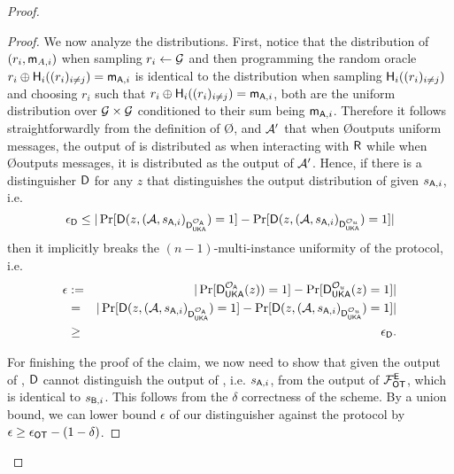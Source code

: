 \begin{proof}
\begin{proof}
We now analyze the distributions. 
First, notice that the distribution of $(r_i,\mathsf{m}_{A,i})$ when sampling $r_i\leftarrow\mathcal{G}$ and then programming the random oracle $r_i\oplus\mathsf{H}_i((r_i)_{i\neq j})=\mathsf{m}_{\mathsf{A},i}$ is identical to the distribution when sampling $\mathsf{H}_i((r_i)_{i\neq j})$ and choosing $r_i$  such that $r_i\oplus\mathsf{H}_i((r_i)_{i\neq j})=\mathsf{m}_{\mathsf{A},i}$, both are the uniform distribution over $\mathcal{G}\times\mathcal{G}$ conditioned to their sum being $\mathsf{m}_{\mathsf{A},i}$. Therefore it follows straightforwardly from the definition of \O, \rec and $\mathcal{A}'$ that when \O outputs uniform messages, the output of \Adv is distributed as when interacting with $\mathsf{R}$ while when \O outputs \UKA messages, it is distributed as the output of $\mathcal{A}'$. Hence, if there is a distinguisher $\mathsf D$ for any $z$ that distinguishes the output distribution of \Adv given $s_{\mathsf{A},i}$, i.e.
$$
\epsilon_{\mathsf D}\leq |\Pr[\mathsf D(z,(\mathcal{A},s_{\mathsf{A},i})_{\mathsf D_{\mathsf{UKA}}^{\mathcal{O}_\mathsf{A}}})=1]-\Pr[\mathsf D(z,(\mathcal{A},s_{\mathsf{A},i})_{\mathsf D_{\mathsf{UKA}}^{\mathcal{O}_u}})=1]|
$$
then it implicitly breaks the $(n-1)$-multi-instance uniformity of the \UKA protocol, i.e. 
\begin{eqnarray*}
\epsilon&:=& |\Pr[\mathsf D_{\mathsf{UKA}}^{\mathcal{O}_{\mathsf{A}}}(z))=1] -\Pr[ \mathsf D_{\mathsf{UKA}}^{\mathcal{O}_u}(z)=1]|\\
&=&|\Pr[\mathsf D(z,(\mathcal{A},s_{\mathsf{A},i})_{\mathsf D_{\mathsf{UKA}}^{\mathcal{O}_{\mathsf{A}}}})=1] -\Pr[ \mathsf D(z,(\mathcal{A},s_{\mathsf{A},i})_{\mathsf D_{\mathsf{UKA}}^{\mathcal{O}_{u}}})=1]|\\
&\geq & \epsilon_{\mathsf D}.
\end{eqnarray*}

For finishing the proof of the claim, we now need to show that given the output of \Adv, $\mathsf D$ cannot distinguish the output of \rec, i.e. $s_{\mathsf{A},i}$,  from the output of $\mathcal{F}_{\mathsf{OT}}^\mathsf{E}$, which is identical to $s_{\mathsf{B},i}$. This follows from the $\delta$ correctness of the \UKA scheme. By a union bound, 
% 
% 
% 
 we can lower bound $\epsilon$ of our distinguisher against the \UKA protocol by $\epsilon\geq\epsilon_{\mathsf{OT}}-(1-\delta)$.
\pe
\end{proof}


\end{proof}
